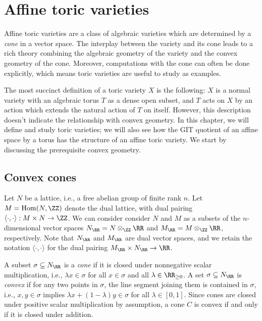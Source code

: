 \documentclass[12pt]{amsart}
\theoremstyle{plain}
\begin{document}
\section{Affine toric varieties}\label{affinetoricvarieties}
Affine toric varieties are a class of algebraic varieties which are determined by a \emph{cone} in a vector space.
The interplay between the variety and its cone leads to a rich theory combining the algebraic geometry of the variety and the convex geometry of the cone.
Moreover, computations with the cone can often be done explicitly, which means toric varieties are useful to study as examples.

The most succinct definition of a toric variety $X$ is the following:
$X$ is a normal variety with an algebraic torus $T$ as a dense open subset, and $T$ acts on $X$ by an action which extends the natural action of $T$ on itself.
However, this description doesn't indicate the relationship with convex geometry.
In this chapter, we will define and study toric varieties; we will also see how the GIT quotient of an affine space by a torus has the structure of an affine toric variety.
We start by discussing the prerequisite convex geometry.

\subsection{Convex cones}
Let $N$ be a lattice, i.e., a free abelian group of finite rank $n$.
Let $M = \mathrm{Hom}(N, \ZZ)$ denote the dual lattice, with dual pairing $\langle \cdot, \cdot \rangle : M \times N \to \ZZ$.
We can consider consider $N$ and $M$ as a subsets of the $n$-dimensional vector spaces
$N_\RR = N \otimes_\ZZ \RR$ and $M_\RR = M \otimes_\ZZ \RR$, respectively.
Note that $N_\RR$ and $M_\RR$ are dual vector spaces, and we retain the notation $\langle \cdot, \cdot \rangle$ for the dual pairing $M_\RR \times N_\RR \to \RR$.

A subset $\sigma \subseteq N_\RR$ is a \emph{cone} if it is closed under nonnegative scalar multiplication, i.e., $\lambda x \in \sigma$ for all $x \in \sigma$ and all $\lambda \in \RR_{\ge 0}$.
A set $\sigma \subseteq N_\RR$ is \emph{convex} if for any two points in $\sigma$, the line segment joining them is contained in $\sigma$,
i.e., $x, y \in \sigma$ implies $\lambda x + (1 - \lambda) y \in \sigma$ for all $\lambda \in [0, 1]$.
Since cones are closed under positive scalar multiplication by assumption, a cone $C$ is convex if and only if it is closed under addition.
\end{document}
